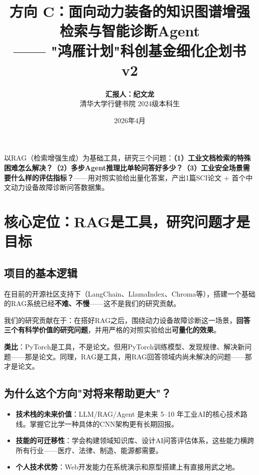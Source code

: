 \documentclass[a4paper, 11pt]{ctexart}
\title{\vspace{-1.5cm}\color{tsinghua}\textbf{方向 C：面向动力装备的知识图谱增强检索与智能诊断Agent}\\\Large{—— "鸿雁计划"科创基金细化企划书 v2}}
\author{\textbf{汇报人：纪文龙} \\ \small 清华大学行健书院 2024级本科生}
\date{\small 2026年4月}
\begin{document}
\maketitle
\thispagestyle{empty}

\begin{tcolorbox}[colback=tsinghua!5, colframe=tsinghua!50, title=\textbf{一句话概括}, fonttitle=\bfseries]
以RAG（检索增强生成）为基础工具，研究三个问题：\textbf{（1）工业文档检索的特殊困难怎么解决？（2）多步Agent推理比单轮问答好多少？（3）工业安全场景需要什么样的评估指标？}——用对照实验给出量化答案，产出1篇SCI论文 + 首个中文动力设备故障诊断问答数据集。
\end{tcolorbox}

\section{核心定位：RAG是工具，研究问题才是目标}

\subsection{项目的基本逻辑}

在目前的开源社区支持下（LangChain、LlamaIndex、Chroma等），搭建一个基础的RAG系统已经\textbf{不难、不慢}——这不是我们的研究贡献。

我们的研究贡献在于：在搭好RAG之后，围绕动力设备故障诊断这一场景，\textbf{回答三个有科学价值的研究问题}，并用严格的对照实验给出\textbf{可量化的效果}。

\begin{tcolorbox}[colback=bglight, colframe=tsinghua!30, arc=2mm]
\textbf{类比}：PyTorch是工具，不是论文。但用PyTorch训练模型、发现规律、解决新问题——那是论文。同理，RAG是工具，用RAG回答领域内尚未解决的问题——那才是论文。
\end{tcolorbox}

\subsection{为什么这个方向"对将来帮助更大"？}

\begin{itemize}
    \item \textbf{技术栈的未来价值}：LLM/RAG/Agent 是未来 5--10 年工业AI的核心技术路线。掌握它比学一种具体的CNN架构更有长期回报。
    \item \textbf{技能的可迁移性}：学会构建领域知识库、设计AI问答评估体系，这些能力横跨所有行业——医疗、法律、制造、能源都需要。
    \item \textbf{个人技术优势}：Web开发能力在系统演示和原型搭建上有直接用武之地。
\end{itemize}
\end{document}
